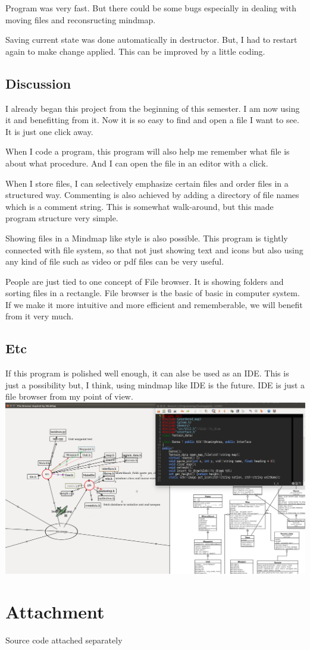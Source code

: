 \documentclass[12pt,a4paper]{report}
\begin{document}
Program was very fast. But there could be some bugs especially in dealing with moving files and reconsructing mindmap.

Saving current state was done automatically in destructor. But, I had to restart again to make change applied. This can be improved by a little coding.

\section{Discussion}
I already began this project from the beginning of this semester. I
am now using it and benefitting from it. Now it is so easy to find and open a file I want to see. It is just one click
away.

When I code a program, this program will also help me remember what file is about what procedure.
And I can open the file in an editor with a click.

When I store files, I can selectively emphasize certain files and order files in a structured way. 
Commenting is also achieved by adding a directory of file names which is a comment string.
This is somewhat walk-around, but this made program structure very simple.

Showing files in a Mindmap like style is also possible.
This program is tightly connected with file system, so that not just showing text and icons but also using any kind of file such as video or pdf files can be very useful.

People are just tied to one concept of File browser. 
It is showing folders and sorting files in a rectangle.
File browser is the basic of basic in computer system.
If we make it more intuitive and more efficient and rememberable, we will benefit from it very much.
\section{Etc}
If this program is polished well enough, it can alse be used as an IDE.
This is just a possibility but, I think, using mindmap like IDE is the future.
IDE is just a file browser from my point of view.
\includegraphics[width=\textwidth]{2.png}
\chapter{Attachment}
Source code attached separately
\end{document}
